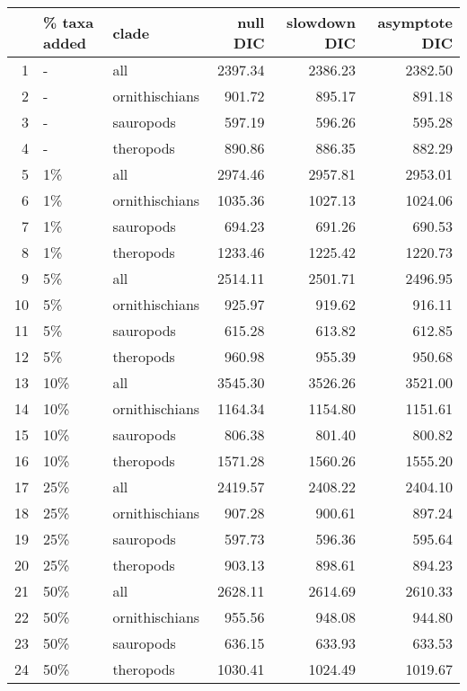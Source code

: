 \begin{table}[ht]
\centering
\begin{tabular}{rllrrr}
  \hline
 & \% taxa added & clade & null DIC & slowdown DIC & asymptote DIC \\ 
  \hline
1 & - & all & 2397.34 & 2386.23 & 2382.50 \\ 
  2 & - & ornithischians & 901.72 & 895.17 & 891.18 \\ 
  3 & - & sauropods & 597.19 & 596.26 & 595.28 \\ 
  4 & - & theropods & 890.86 & 886.35 & 882.29 \\ 
  5 & 1\% & all & 2974.46 & 2957.81 & 2953.01 \\ 
  6 & 1\% & ornithischians & 1035.36 & 1027.13 & 1024.06 \\ 
  7 & 1\% & sauropods & 694.23 & 691.26 & 690.53 \\ 
  8 & 1\% & theropods & 1233.46 & 1225.42 & 1220.73 \\ 
  9 & 5\% & all & 2514.11 & 2501.71 & 2496.95 \\ 
  10 & 5\% & ornithischians & 925.97 & 919.62 & 916.11 \\ 
  11 & 5\% & sauropods & 615.28 & 613.82 & 612.85 \\ 
  12 & 5\% & theropods & 960.98 & 955.39 & 950.68 \\ 
  13 & 10\% & all & 3545.30 & 3526.26 & 3521.00 \\ 
  14 & 10\% & ornithischians & 1164.34 & 1154.80 & 1151.61 \\ 
  15 & 10\% & sauropods & 806.38 & 801.40 & 800.82 \\ 
  16 & 10\% & theropods & 1571.28 & 1560.26 & 1555.20 \\ 
  17 & 25\% & all & 2419.57 & 2408.22 & 2404.10 \\ 
  18 & 25\% & ornithischians & 907.28 & 900.61 & 897.24 \\ 
  19 & 25\% & sauropods & 597.73 & 596.36 & 595.64 \\ 
  20 & 25\% & theropods & 903.13 & 898.61 & 894.23 \\ 
  21 & 50\% & all & 2628.11 & 2614.69 & 2610.33 \\ 
  22 & 50\% & ornithischians & 955.56 & 948.08 & 944.80 \\ 
  23 & 50\% & sauropods & 636.15 & 633.93 & 633.53 \\ 
  24 & 50\% & theropods & 1030.41 & 1024.49 & 1019.67 \\ 
   \hline
\end{tabular}
\caption{} 
\end{table}
